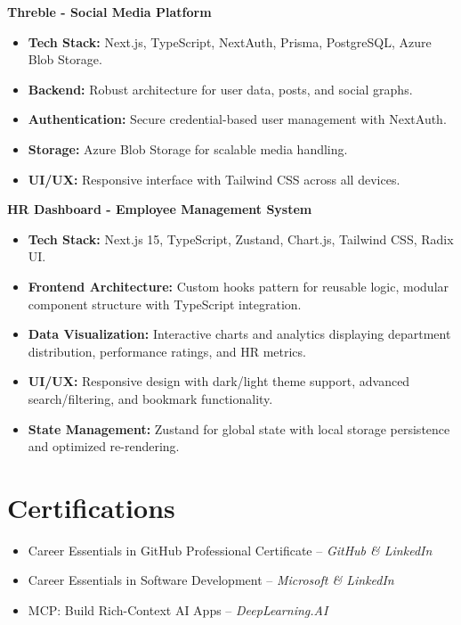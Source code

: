 \documentclass[a4paper,10pt]{article}
\newcommand{\entryTitle}[1]{\noindent\textbf{#1}}
\begin{document}
\vspace{2pt}
\entryTitle{Threble - Social Media Platform}
\begin{itemize}
    \item \textbf{Tech Stack:} Next.js, TypeScript, NextAuth, Prisma, PostgreSQL, Azure Blob Storage.
    \item \textbf{Backend:} Robust architecture for user data, posts, and social graphs.
    \item \textbf{Authentication:} Secure credential-based user management with NextAuth.
    \item \textbf{Storage:} Azure Blob Storage for scalable media handling.
    \item \textbf{UI/UX:} Responsive interface with Tailwind CSS across all devices.
\end{itemize}

\vspace{2pt}
\entryTitle{HR Dashboard - Employee Management System}
\begin{itemize}
    \item \textbf{Tech Stack:} Next.js 15, TypeScript, Zustand, Chart.js, Tailwind CSS, Radix UI.
    \item \textbf{Frontend Architecture:} Custom hooks pattern for reusable logic, modular component structure with TypeScript integration.
    \item \textbf{Data Visualization:} Interactive charts and analytics displaying department distribution, performance ratings, and HR metrics.
    \item \textbf{UI/UX:} Responsive design with dark/light theme support, advanced search/filtering, and bookmark functionality.
    \item \textbf{State Management:} Zustand for global state with local storage persistence and optimized re-rendering.
\end{itemize}

\section*{Certifications}
\begin{itemize}
    \item Career Essentials in GitHub Professional Certificate – \textit{GitHub \& LinkedIn}
    \item Career Essentials in Software Development – \textit{Microsoft \& LinkedIn}
    \item MCP: Build Rich-Context AI Apps – \textit{DeepLearning.AI}
\end{itemize}
\end{document}
